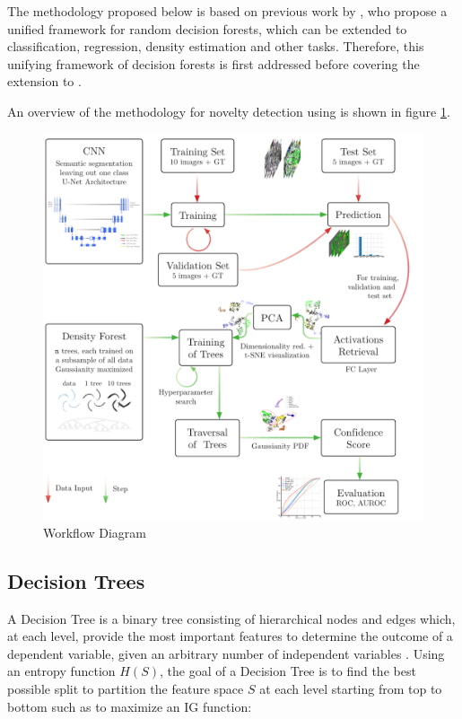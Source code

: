\documentclass[10pt]{article}
\begin{document}
The methodology proposed below is based on previous work by \textcite{decisionForests-MSR}, who propose a unified framework for random decision forests, which can be extended to classification, regression, density estimation and other tasks. Therefore, this unifying framework of decision forests is first addressed before covering the extension to . 

An overview of the methodology for novelty detection using  is shown in figure \ref{fig:schema}.

\begin{figure}[!ht]
    \centering
    \includegraphics[width=\textwidth]{Schema/schema_df}
    \caption{Workflow Diagram}
    \label{fig:schema}
\end{figure}

\subsection{Decision Trees}
A Decision Tree is a binary tree consisting of hierarchical nodes and edges which, at each level, provide the most important features to determine the outcome of a dependent variable, given an arbitrary number of independent variables \cite{decisionForests-MSR}. Using an entropy function $H(S)$, the goal of a Decision Tree is to find the best possible split to partition the feature space $S$ at each level starting from top to bottom such as to maximize an \acrlong{IG} function:
\end{document}
